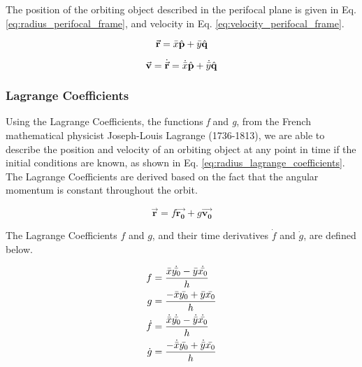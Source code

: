 The position of the orbiting object described in the perifocal plane is given in Eq. \ref{eq:radius_perifocal_frame}, and velocity in Eq. \ref{eq:velocity_perifocal_frame}.

\begin{equation}
    \Vec{\mathbf{r}} = \Bar{x}\hat{\mathbf{p}} + \Bar{y}\hat{\mathbf{q}}
    \label{eq:radius_perifocal_frame}
\end{equation}

\begin{equation}
    \Vec{\mathbf{v}} = \dot{\Vec{\mathbf{r}}} = \dot{\Bar{x}}\hat{\mathbf{p}} + \dot{\Bar{y}}\hat{\mathbf{q}}
    \label{eq:velocity_perifocal_frame}
\end{equation}



\subsubsection{Lagrange Coefficients}

Using the Lagrange Coefficients, the functions \textit{f} and \textit{g}, from the French mathematical physicist Joseph-Louis Lagrange (1736-1813), we are able to describe the position and velocity of an orbiting object at any point in time if the initial conditions are known, as shown in Eq. \ref{eq:radius_lagrange_coefficients}. The Lagrange Coefficients are derived based on the fact that the angular momentum is constant throughout the orbit.   


\begin{equation}
    \Vec{\mathbf{r}} = f \Vec{\mathbf{r_0}} + g \Vec{\mathbf{v_0}}
    \label{eq:radius_lagrange_coefficients}
\end{equation}

The Lagrange Coefficients $f$ and $g$, and their time derivatives $\dot{f}$ and $\dot{g}$, are defined below.

\begin{align}
    f &= \frac{ \Bar{x} \dot{\Bar{y_0}} - \Bar{y} \dot{\Bar{x_0}} }{ h }
    \label{eq:lagrange_f} \\
    g &= \frac{ - \Bar{x} \Bar{y_0} + \Bar{y} \Bar{x_0} }{ h } 
    \label{eq:lagrange_g} \\
    \dot{f} &= \frac{ \dot{\Bar{x}} \dot{\Bar{y_0}} - \dot{\Bar{y}} \dot{\Bar{x_0}} }{ h } 
    \label{eq:lagrange_f_dot} \\
    \dot{g} &= \frac{ - \dot{\Bar{x}} \Bar{y_0} + \dot{\Bar{y}} \Bar{x_0} }{ h } 
    \label{eq:lagrange_g_dot}
\end{align}


